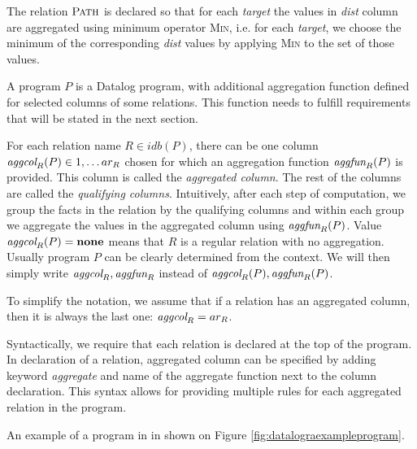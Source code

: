 
The relation $\textsc{Path}$ is declared so that for each \textit{target} the values in \textit{dist} column are aggregated using minimum operator \textsc{Min}, i.e. for each \textit{target}, we choose the minimum of the corresponding \textit{dist} values by applying \textsc{Min} to the set of those values.

A \datalogra program $P$ is a Datalog program, with additional aggregation function defined for selected columns of some relations. This function needs to fulfill requirements that will be stated in the next section.

For each relation name $R \in idb(P)$, there can be one column $\textit{aggcol}_R(P) \in {1, \dots ar_R}$ chosen for which an aggregation function $\textit{aggfun}_R(P)$ is provided. This column is called the \emph{aggregated column}. The rest of the columns are called the \emph{qualifying columns}. Intuitively, after each step of computation, we group the facts in the relation by the qualifying columns and within each group we aggregate the values in the aggregated column using $\textit{aggfun}_R(P)$. Value $\textit{aggcol}_R(P) = \bf{none}$ means that $R$ is a regular relation with no aggregation. Usually program $P$ can be clearly determined from the context. We will then simply write $\textit{aggcol}_R, \textit{aggfun}_R$ instead of $\textit{aggcol}_R(P), \textit{aggfun}_R(P)$.

To simplify the notation, we assume that if a relation has an aggregated column, then it is always the last one: $\textit{aggcol}_R = ar_R$.

Syntactically, we require that each \idb relation is declared at the top of the program.
In declaration of a relation, aggregated column can be specified by adding keyword \textit{aggregate} and name of the aggregate function next to the column declaration. This syntax allows for providing multiple rules for each aggregated relation in the program.

An example of a program in \datalogra in shown on Figure \ref{fig:datalograexampleprogram}.

